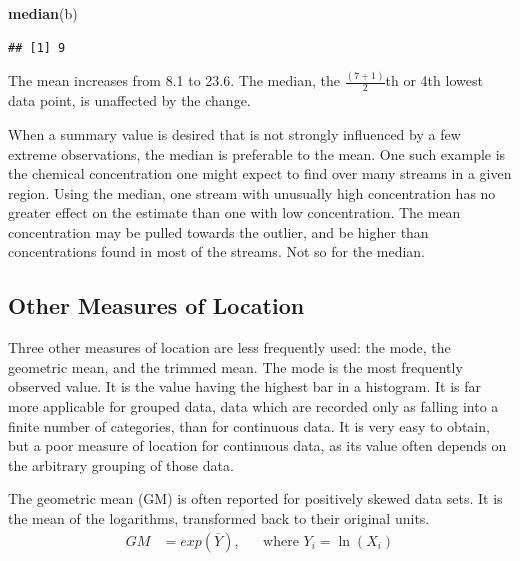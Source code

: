 \documentclass[]{book}
\newenvironment{Shaded}{\begin{snugshade}}{\end{snugshade}}
\newcommand{\KeywordTok}[1]{\textcolor[rgb]{0.13,0.29,0.53}{\textbf{#1}}}
\newcommand{\NormalTok}[1]{#1}
\begin{document}
\begin{Shaded}
\begin{Highlighting}[]
\KeywordTok{median}\NormalTok{(b)}
\end{Highlighting}
\end{Shaded}

\begin{verbatim}
## [1] 9
\end{verbatim}

The mean increases from 8.1 to 23.6. The median, the \(\frac{(7+1)}{2}\)th or 4th lowest data point, is unaffected by the change.

When a summary value is desired that is not strongly influenced by a few extreme observations, the median is preferable to the mean. One such example is the chemical concentration one might expect to find over many streams in a given region. Using the median, one stream with unusually high concentration has no greater effect on the estimate than one with low concentration. The mean concentration may be pulled towards the outlier, and be higher than concentrations found in most of the streams. Not so for the median.

\hypertarget{other-measures-of-location}{%
\subsection{Other Measures of Location}\label{other-measures-of-location}}

Three other measures of location are less frequently used: the mode, the geometric mean, and the trimmed mean. The mode is the most frequently observed value. It is the value having the highest bar in a histogram. It is far more applicable for grouped data, data which are recorded only as falling into a finite number of categories, than for continuous data. It is very easy to obtain, but a poor measure of location for continuous data, as its value often depends on the arbitrary grouping of those data.

The geometric mean (GM) is often reported for positively skewed data sets. It is the mean of the logarithms, transformed back to their original units.
\begin{equation}
\begin{aligned}
GM & = exp\left( \overline{Y} \right), && \text{where $Y_{i} = \ln{(X_{i})}$}\\
\end{aligned}
\label{eq:1-5}
\end{equation}
\end{document}

